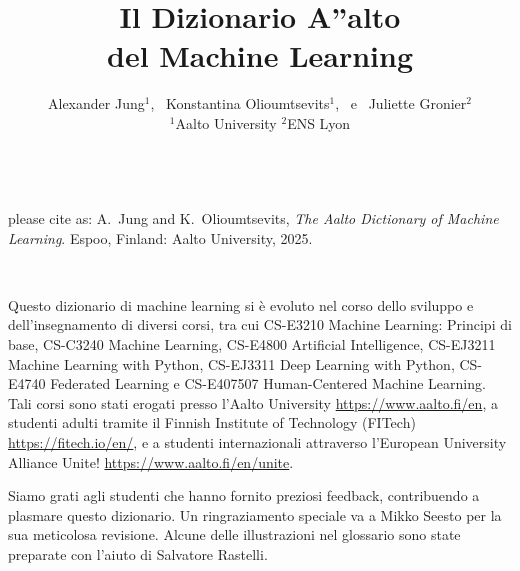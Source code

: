 \documentclass[journal,12pt,onecolumn]{article}
\begin{document}

\title {\vspace*{10mm}
	{\huge {\bf Il Dizionario {\fontsize{40}{48}\selectfont \textbf{\textsf{A\hspace*{-2mm}''}}}\hspace*{-4mm}alto \\ del Machine Learning}}  \\[-5mm] 
}

\author{\hspace{-2mm}Alexander Jung${}^{1}$, \ Konstantina Olioumtsevits${}^{1}$, \ e \ Juliette Gronier${}^{2}$ \\[-2mm]
	${}^{1}$Aalto University \quad ${}^{2}$ENS Lyon}

\maketitle
	\begin{center}
		\\[10mm]
{\large	please cite as: A.\ Jung and K.\ Olioumtsevits, \textit{The Aalto Dictionary of Machine Learning}. Espoo, Finland: Aalto University, 2025.}
\end{center}

\newpage 
{}\

\noindent Questo dizionario di machine learning si è evoluto nel corso dello sviluppo e dell’insegnamento di diversi corsi, tra cui CS-E3210 Machine Learning: Principi di base, CS-C3240 Machine Learning, CS-E4800 Artificial Intelligence, CS-EJ3211 Machine Learning with Python, CS-EJ3311 Deep Learning with Python, CS-E4740 Federated Learning e CS-E407507 Human-Centered Machine Learning. Tali corsi sono stati erogati presso l’Aalto University \url{https://www.aalto.fi/en}, a studenti adulti tramite il Finnish Institute of Technology (FITech) \url{https://fitech.io/en/}, e a studenti internazionali attraverso l’European University Alliance Unite! \url{https://www.aalto.fi/en/unite}.

\noindent Siamo grati agli studenti che hanno fornito preziosi feedback, contribuendo a plasmare questo dizionario. Un ringraziamento speciale va a Mikko Seesto per la sua meticolosa revisione. Alcune delle illustrazioni nel glossario sono state preparate con l'aiuto di Salvatore Rastelli.
\end{document}
